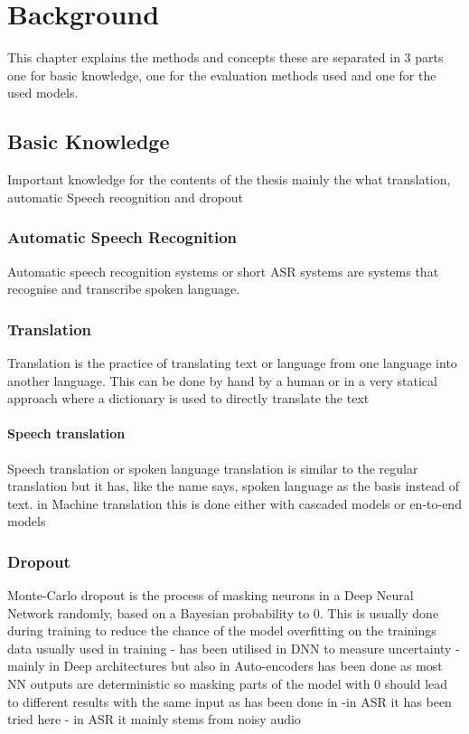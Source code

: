 \chapter{Background}
This chapter explains the methods and concepts these are separated in 3 parts one for basic knowledge, one for the evaluation methods used and one for the used models. 

\section{Basic Knowledge}
Important knowledge for the contents of the thesis mainly the what translation, automatic Speech recognition and dropout


\subsection{Automatic Speech Recognition}
Automatic speech recognition systems or short ASR systems are systems that recognise and transcribe spoken language. 


\subsection{Translation}
Translation is the practice of translating text or language from one language into another language. This can be done by hand by a human or in a very statical approach where a dictionary is used to directly translate the text 

\subsubsection{Speech translation}
Speech translation or spoken language translation is similar to the regular translation but it has, like the name says, spoken language as the basis instead of text. 
in Machine translation this is done either with cascaded models or en-to-end models 


\subsection{Dropout}
Monte-Carlo dropout is the process of masking neurons in a Deep Neural Network randomly, based on a Bayesian probability to 0. This is usually done during training to reduce the chance of the model overfitting on the trainings data \cite{}
usually used in training 
- has been utilised in DNN to measure uncertainty
- mainly in Deep architectures but also in Auto-encoders
has been done as most NN outputs are deterministic so masking parts of the model with 0 should lead to different results with the same input as has been done in \cite{gal2016dropoutbayesianapproximationrepresenting}
-in ASR it has been tried here  \cite{8683086}
- in ASR it mainly stems from noisy audio 

